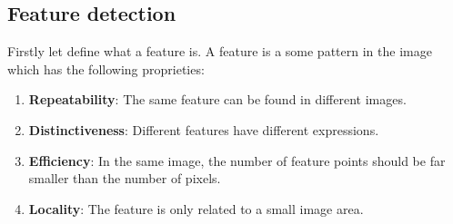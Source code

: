 \subsection{Feature detection}
Firstly let define what a feature is. A feature is a some pattern in the image which has the following proprieties:
\begin{enumerate}
    \item {\bf Repeatability}: The same feature can be found in different images.
    \item {\bf Distinctiveness}: Different features have different expressions.
    \item {\bf Efficiency}: In the same image, the number of feature points should be far smaller than the number of pixels.
    \item {\bf Locality}: The feature is only related to a small image area.
\end{enumerate}

